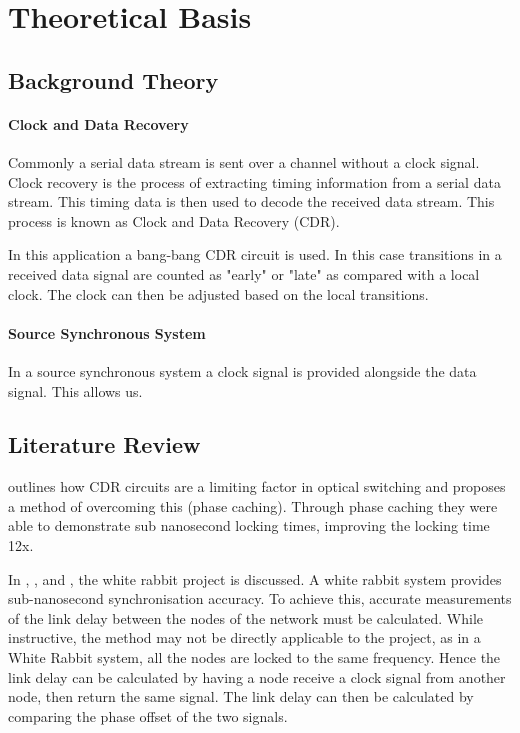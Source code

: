 \chapter{Theoretical Basis}

\section{Background Theory}%
\label{sec:background_theory}

\subsubsection{Clock and Data Recovery}%
\label{ssub:clock_and_data_recovery}
Commonly a serial data stream is sent over a channel without a clock signal.
Clock recovery is the process of extracting timing information from a serial
data stream. This timing data is then used to decode the received data stream.
This process is known as Clock and Data Recovery (CDR).

In this application a bang-bang CDR circuit is used. 
In this case transitions in a received data signal are counted as "early" or
"late" as compared with a local clock. The clock can then be adjusted based on
the local transitions\cite{alexander1975clock}.

\subsubsection{Source Synchronous System}%
\label{ssub:source_synchronous_system}
In a source synchronous system a clock signal is provided alongside the data
signal. This allows us.

\section{Literature Review}%
\label{sec:literature_review}

\noindent \cite{kari_phase} outlines how CDR circuits are a limiting factor in
optical switching and proposes a method of overcoming this (phase caching).
Through phase caching they were able to demonstrate sub nanosecond locking
times, improving the locking time 12x.

\noindent In \cite{serrano2013white}, \cite{moreira2010digital}, and
\cite{moreira2009white}, the white rabbit project is discussed. A white rabbit
system provides sub-nanosecond synchronisation accuracy. To achieve this,
accurate measurements of the link delay between the nodes of the network must
be calculated.  While instructive, the method may not be directly applicable to
the project, as in a White Rabbit system, all the nodes are locked to the same
frequency. Hence the link delay can be calculated by having a node receive a
clock signal from another node, then return the same signal. The link delay can
then be calculated by comparing the phase offset of the two signals.

